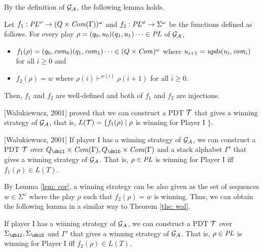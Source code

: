 By the definition of ${\cal G}_{\cal A}$,
the following lemma holds.
\begin{lemma}
\label{lem: cor}
Let $f_1: \mathit{PL}^\omega\to(Q\times\mathit{Com}(\Gamma))^\omega$ and
$f_2: \mathit{PL}^\omega\to\Sigma^\omega$ be the functions defined as follows.
For every play
$\rho=(q_0,u_0)(q_1,u_1)\cdots\in \mathit{PL}$ of ${\cal G}_{\cal A}$,
\begin{itemize}
\item $f_1(\rho)=(q_0,\mathit{com}_0)(q_1,\mathit{com}_1)\cdots\in (Q\times\mathit{Com})^\omega$ where
$u_{i+1} = \mathit{upds}(u_{i},\mathit{com}_i)$
for all $i\geq 0$ and
\item $f_2(\rho)=w$ where $\rho(i)\vdash^{w(i)} \rho(i+1)$
for all $i\geq 0$.
\end{itemize}
Then, $f_1$ and $f_2$ are well-defined and both of $f_1$ and $f_2$ are injections.
\end{lemma}
[Walukiewucz, 2001] proved that
we can construct a PDT ${\cal T}$
that gives a winning strategy of ${\cal G}_{\cal A}$,
that is, $L({\cal T}) = \{ f_1(\rho) \mid
\rho$ is winning for Player I $\}$.
\begin{theorem}{[Walukiewucz, 2001]}
\label{the: wal}
If player I has a winning strategy of ${\cal G}_{\cal A}$,
we can construct a PDT ${\cal T}$ over $Q_\dblI\times\Com(\Gamma), Q_\dblO\times\Com(\Gamma)$ and a stack alphabet $\Gamma'$ that gives a winning strategy of ${\cal G}_{\cal A}$.
That is, $\rho\in \mathit{PL}$ is winning for Player I iff $f_1(\rho)\in L(T)$.
\end{theorem}

By Lemma \ref{lem: cor},
a winning strategy can be also given as
the set of sequences $w\in\Sigma^\omega$
where the play $\rho$ such that $f_2(\rho)=w$ is winning.
Thus, we can obtain the following lemma
in a similar way to Theorem \ref{the: wal}.
\begin{lemma}
\label{lem: 2}
If player I has a winning strategy of ${\cal G}_{\cal A}$,
we can construct a PDT ${\cal T}$ over $\Sigma_\dblI, \Sigma_\dblO$ and $\Gamma'$ that gives a winning strategy of ${\cal G}_{\cal A}$.
That is, $\rho\in \mathit{PL}$ is winning for Player I iff $f_2(\rho)\in L(T)$.
\end{lemma}
